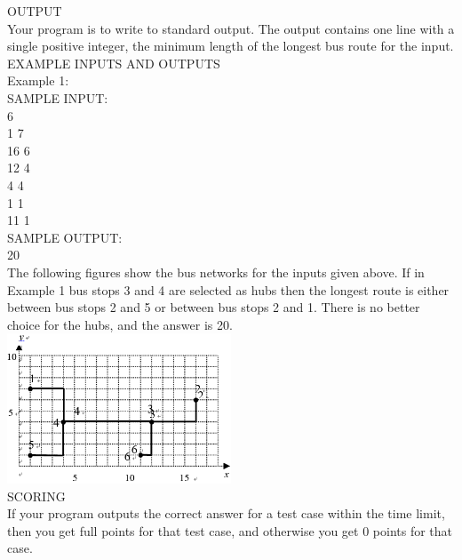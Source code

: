 \documentclass[12pt,twiside,a4paper]{ctexbook}
\numberwithin{chapter}{part}
\begin{document}
OUTPUT\\
Your program is to write to standard output. The output contains one line with a single positive integer, the minimum length of the longest bus route for the input.\\
EXAMPLE INPUTS AND OUTPUTS\\
Example 1:\\
SAMPLE INPUT:\\
6\\
1 7\\
16 6\\
12 4\\
4 4\\
1 1\\
11 1\\
SAMPLE OUTPUT:\\
20\\
The following figures show the bus networks for the inputs given above. If in Example 1 bus stops 3 and 4 are selected as hubs then the longest route is either between bus stops 2 and 5 or between bus stops 2 and 1. There is no better choice for the hubs, and the answer is 20. \\
\includegraphics[width=0.5\textwidth]{bus.png}\\
SCORING\\
If your program outputs the correct answer for a test case within the time limit, then you get full points for that test case, and otherwise you get 0 points for that case.
\end{document}
